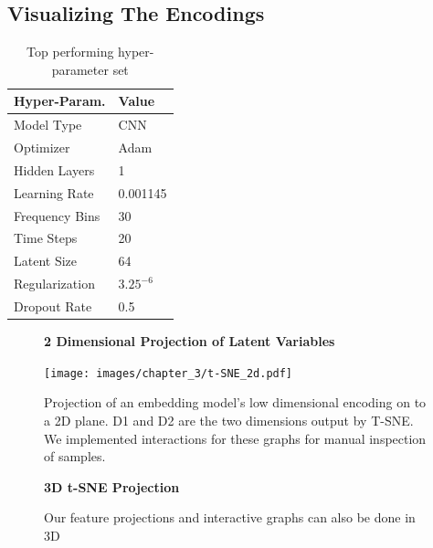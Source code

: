 \documentclass[\main/thesis.tex]{subfiles}
\begin{document}
\subsection{Visualizing The Encodings}
\label{fig:embedding_FE}
\begin{table}[htbp!]
\centering
\begin{tabular}{|p{6cm}|p{6cm}|}
\hline
Hyper-Param. & Value  \\ \hline
Model Type      &  CNN  \\ \hline
Optimizer       & Adam  \\ \hline
Hidden Layers   & 1  \\\hline
Learning Rate   &  0.001145\\ \hline
Frequency Bins & 30 \\ \hline
Time Steps & 20 \\ \hline
Latent Size & 64 \\ \hline
Regularization & $3.25^{-6}$ \\ \hline
Dropout Rate & 0.5 \\ \hline
\end{tabular}
\caption{Top performing hyper-parameter set}
\label{table:best_params}
\end{table}
\begin{figure}[h!]
\centering
\textbf{2 Dimensional Projection of Latent Variables}\par\medskip
 \texttt{[image: images/chapter\_3/t-SNE\_2d.pdf]}
\caption{Projection of an embedding model's low dimensional encoding on to a 2D plane. D1 and D2 are the two dimensions output by T-SNE. We implemented interactions for these graphs for manual inspection of samples.}
\label{fig:2d_tsne}
\end{figure}

\begin{figure}[htbp!]
\centering
\textbf{3D t-SNE Projection}\par\medskip
\mbox{}

\mbox{}

\caption{Our feature projections and interactive graphs can also be done in 3D}
\label{fig:3d_tsne}
\end{figure}
\end{document}
